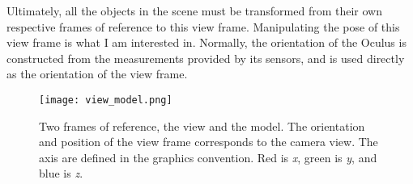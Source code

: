 Ultimately, all the objects in the scene must be transformed from their own
respective frames of reference to this view frame. Manipulating the pose of
this view frame is what I am interested in. Normally, the orientation of
the Oculus is constructed from the measurements provided by its sensors,
and is used directly as the orientation of the view frame.

\begin{figure}[]
\centering
\texttt{[image: view\_model.png]}
\caption{Two frames of reference, the view and the model. The orientation and
position of the view frame corresponds to the camera view. The axis are
defined in the graphics convention. Red is \emph{x}, green is \emph{y}, 
and blue is \emph{z}.}
\label{fig:worldview}
\end{figure}

